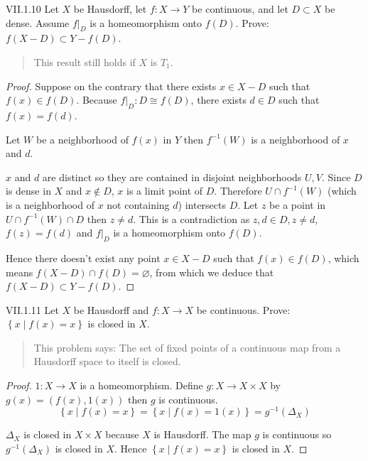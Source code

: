 \begin{problem}{VII.1.10}\label{problem:VII.1.10}
Let \( X \) be Hausdorff, let \( f: X \to Y \) be continuous, and let \( D \subset X \) be dense. Assume \( f\vert_{D} \) is a homeomorphism onto \( f(D) \). Prove: \( f(X - D) \subset Y - f(D) \).
\end{problem}

\begin{quotation}
	This result still holds if \( X \) is \( T_{1} \).
\end{quotation}

\begin{proof}
	Suppose on the contrary that there exists \( x \in X - D \) such that \( f(x) \in f(D) \). Because \( f\vert_{D}: D \cong f(D) \), there exists \( d \in D \) such that \( f(x) = f(d) \).

	Let \( W \) be a neighborhood of \( f(x) \) in \( Y \) then \( f^{-1}(W) \) is a neighborhood of \( x \) and \( d \).

	\( x \) and \( d \) are distinct so they are contained in disjoint neighborhoods \( U, V \). Since \( D \) is dense in \( X \) and \( x \notin D \), \( x \) is a limit point of \( D \). Therefore \( U \cap f^{-1}(W) \) (which is a neighborhood of \(x\) not containing \(d\)) intersects \( D \). Let \( z \) be a point in \( U \cap f^{-1}(W) \cap D \) then \( z \ne d \). This is a contradiction as \( z, d \in D, z \ne d \), \( f(z) = f(d) \) and \( f\vert_{D} \) is a homeomorphism onto \( f(D) \).

	Hence there doesn't exist any point \( x \in X - D \) such that \( f(x) \in f(D) \), which means \( f(X - D) \cap f(D) = \varnothing \), from which we deduce that \( f(X - D) \subset Y - f(D) \).
\end{proof}

\begin{problem}{VII.1.11}
Let \( X \) be Hausdorff and \( f: X \to X \) be continuous. Prove: \( \left\{ x \mid f(x) = x \right\} \) is closed in \( X \).
\end{problem}

\begin{quotation}
	This problem says: The set of fixed points of a continuous map from a Hausdorff space to itself is closed.
\end{quotation}

\begin{proof}
	\( 1: X \to X \) is a homeomorphism. Define \( g: X \to X \times X \) by \( g(x) = (f(x), 1(x)) \) then \( g \) is continuous.
	\[
		\left\{ x \mid f(x) = x \right\} = \left\{ x \mid f(x) = 1(x) \right\} = g^{-1}(\Delta_{X})
	\]

	\( \Delta_{X} \) is closed in \( X \times X \) because \( X \) is Hausdorff. The map \( g \) is continuous so \( g^{-1}(\Delta_{X}) \) is closed in \( X \). Hence \( \left\{ x \mid f(x) = x \right\} \) is closed in \( X \).
\end{proof}

